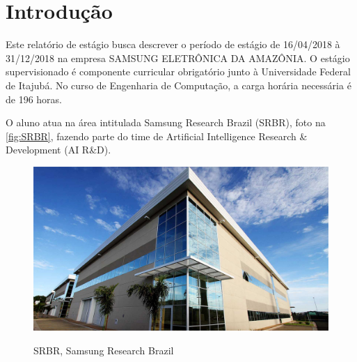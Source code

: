 \documentclass[
	12pt,				%
    oneside,			%
	a4paper,			%
	english,			%
	french,				%
	spanish,			%
	brazil				%
	]{abntex2}
\begin{document}

\frenchspacing

\imprimircapa
\imprimirfolhaderosto*

\tableofcontents*
\clearpage

\textual

\chapter{Introdução}

Este relatório de estágio busca descrever o período de estágio de 16/04/2018 à 31/12/2018 na empresa SAMSUNG ELETRÔNICA DA AMAZÔNIA. O estágio supervisionado é componente curricular obrigatório junto à Universidade Federal de Itajubá. No curso de Engenharia de Computação, a carga horária necessária é de 196 horas.

O aluno atua na área intitulada Samsung Research Brazil (SRBR), foto na \autoref{fig:SRBR}, fazendo parte do time de Artificial Intelligence Research \& Development (AI R\&D).

\begin{figure}[H]
  \centering
  \includegraphics[width=400pt]{Imgs/srbr-image.jpg}\\
  \caption[SRBR, Samsung Research Brazil]{SRBR, Samsung Research Brazil}
  \label{fig:SRBR}
\end{figure}
\end{document}
